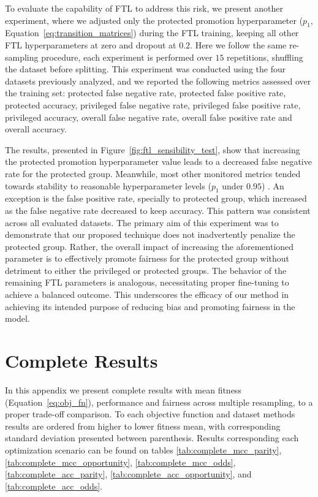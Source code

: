 To evaluate the capability of FTL to address this risk, we present another experiment, where we adjusted only the protected promotion hyperparameter ($p_1$,  Equation~\ref{eq:transition_matrices}) during the FTL training, keeping all other FTL hyperparameters at zero and dropout at $0.2$. Here we follow the same re-sampling procedure, each experiment is performed over $15$ repetitions, shuffling the dataset before splitting. This experiment was conducted using the four datasets previously analyzed, and we reported the following metrics assessed over the training set: protected false negative rate, protected false positive rate, protected accuracy, privileged false negative rate, privileged false positive rate, privileged accuracy, overall false negative rate, overall false positive rate and overall accuracy. 

The results, presented in Figure~\ref{fig:ftl_sensibility_test}, show that increasing the protected promotion hyperparameter value leads to a decreased false negative rate for the protected group. Meanwhile, most other monitored metrics tended towards stability to reasonable hyperparameter levels ($p_1$ under $0.95$) . An exception is the false positive rate, specially to protected group, which increased as the false negative rate decreased to keep accuracy. This pattern was consistent across all evaluated datasets. The primary aim of this experiment was to demonstrate that our proposed technique does not inadvertently penalize the protected group. Rather, the overall impact of increasing the aforementioned parameter is to effectively promote fairness for the protected group without detriment to either the privileged or protected groups. The behavior of the remaining FTL parameters is analogous, necessitating proper fine-tuning to achieve a balanced outcome. This underscores the efficacy of our method in achieving its intended purpose of reducing bias and promoting fairness in the model.



\section{Complete Results}\label{apendix:results}

\setcounter{table}{0}
\renewcommand{\thetable}{A.\arabic{table}}

In this appendix we present complete results with mean fitness (Equation~\ref{eq:obj_fn}), performance and fairness across multiple resampling, to a proper trade-off comparison. To each objective function and dataset methods results are ordered from higher to lower fitness mean, with corresponding standard deviation presented between parenthesis. Results corresponding each optimization scenario can be found on tables \ref{tab:complete_mcc_parity}, \ref{tab:complete_mcc_opportunity}, \ref{tab:complete_mcc_odds}, \ref{tab:complete_acc_parity}, \ref{tab:complete_acc_opportunity}, and \ref{tab:complete_acc_odds}.


